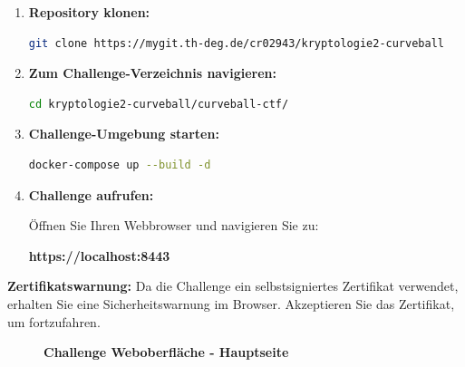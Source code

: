 \documentclass{article}
\begin{document}
\begin{enumerate}[leftmargin=1.5cm]
    \item \textbf{Repository klonen:}
    \begin{lstlisting}[language=bash]
git clone https://mygit.th-deg.de/cr02943/kryptologie2-curveball
    \end{lstlisting}

    \item \textbf{Zum Challenge-Verzeichnis navigieren:}
    \begin{lstlisting}[language=bash]
cd kryptologie2-curveball/curveball-ctf/
    \end{lstlisting}
    
    \item \textbf{Challenge-Umgebung starten:}
    \begin{lstlisting}[language=bash]
docker-compose up --build -d
    \end{lstlisting}
    
    \item \textbf{Challenge aufrufen:}
    
    Öffnen Sie Ihren Webbrowser und navigieren Sie zu:
    \begin{center}
        \textcolor{thd-blue}{\textbf{\large https://localhost:8443}}
    \end{center}
\end{enumerate}

\begin{infobox}
\textbf{Zertifikatswarnung:} Da die Challenge ein selbstsigniertes Zertifikat verwendet, erhalten Sie eine Sicherheitswarnung im Browser. Akzeptieren Sie das Zertifikat, um fortzufahren.
\end{infobox}

\begin{figure}[htbp]
  \centering
  \caption{\textcolor{thd-blue}{\textbf{Challenge Weboberfläche - Hauptseite}}}
  \label{fig:webpage}
\end{figure}
\end{document}
